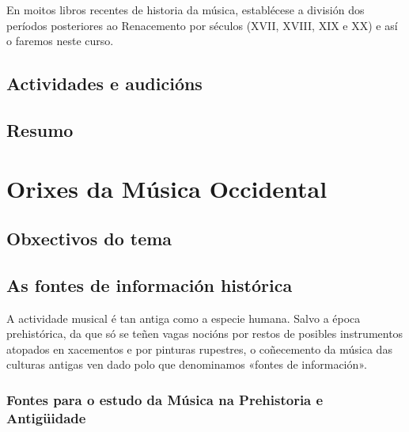 \documentclass[a4paper, twoside]{templates/ociamthesis}
\begin{document}
En moitos libros recentes de historia da música, establécese a división dos períodos posteriores ao Renacemento por séculos (XVII, XVIII, XIX e XX) e así o faremos neste curso.

\hypertarget{actividades-e-audiciuxf3ns}{%
\section*{Actividades e audicións}\label{actividades-e-audiciuxf3ns}}

\hypertarget{resumo}{%
\section*{Resumo}\label{resumo}}

\hypertarget{orixes-da-muxfasica-occidental}{%
\chapter{Orixes da Música Occidental}\label{orixes-da-muxfasica-occidental}}

\minitoc 

\hypertarget{obxectivos-do-tema-1}{%
\section*{Obxectivos do tema}\label{obxectivos-do-tema-1}}

\hypertarget{as-fontes-de-informaciuxf3n-histuxf3rica}{%
\section{As fontes de información histórica}\label{as-fontes-de-informaciuxf3n-histuxf3rica}}

A actividade musical é tan antiga como a especie humana. Salvo a época prehistórica, da que só se teñen vagas nocións por restos de posibles instrumentos atopados en xacementos e por pinturas rupestres, o coñecemento da música das culturas antigas ven dado polo que denominamos «fontes de información».

\hypertarget{fontes-para-o-estudo-da-muxfasica-na-prehistoria-e-antiguxfcidade}{%
\subsection{Fontes para o estudo da Música na Prehistoria e Antigüidade}\label{fontes-para-o-estudo-da-muxfasica-na-prehistoria-e-antiguxfcidade}}
\end{document}
